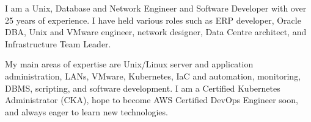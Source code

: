 
I am a Unix, Database and Network Engineer and Software Developer with over 25 years of experience. I have held various roles such as ERP developer, Oracle DBA, Unix and VMware engineer, network designer, Data Centre architect, and Infrastructure Team Leader. 
\par
My main areas of expertise are Unix/Linux server and application administration, LANs, VMware, Kubernetes, IaC and automation, monitoring, DBMS, scripting, and software development. I am a Certified Kubernetes Administrator (CKA), hope to become AWS Certified DevOps Engineer soon, and always eager to learn new technologies.
